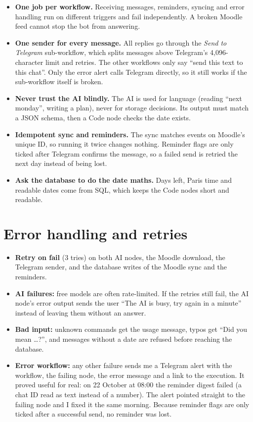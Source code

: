 \documentclass[10pt,a4paper]{article}
\begin{document}
\begin{itemize}
  \item \textbf{One job per workflow.} Receiving messages, reminders, syncing and error handling run on different
  triggers and fail independently. A broken Moodle feed cannot stop the bot from answering.
  \item \textbf{One sender for every message.} All replies go through the \emph{Send to Telegram} sub-workflow, which
  splits messages above Telegram's 4,096-character limit and retries. The other workflows only say ``send this text to
  this chat''. Only the error alert calls Telegram directly, so it still works if the sub-workflow itself is broken.
  \item \textbf{Never trust the AI blindly.} The AI is used for language (reading ``next monday'', writing a plan), never
  for storage decisions. Its output must match a JSON schema, then a Code node checks the date exists.
  \item \textbf{Idempotent sync and reminders.} The sync matches events on Moodle's unique ID, so running it twice
  changes nothing. Reminder flags are only ticked after Telegram confirms the message, so a failed send is retried the
  next day instead of being lost.
  \item \textbf{Ask the database to do the date maths.} Days left, Paris time and readable dates come from SQL, which
  keeps the Code nodes short and readable.
\end{itemize}

\section{Error handling and retries}

\begin{itemize}
  \item \textbf{Retry on fail} (3 tries) on both AI nodes, the Moodle download, the Telegram sender, and the database
  writes of the Moodle sync and the reminders.
  \item \textbf{AI failures:} free models are often rate-limited. If the retries still fail, the AI node's error output
  sends the user ``The AI is busy, try again in a minute'' instead of leaving them without an answer.
  \item \textbf{Bad input:} unknown commands get the usage message, typos get ``Did you mean \ldots?'', and messages
  without a date are refused before reaching the database.
  \item \textbf{Error workflow:} any other failure sends me a Telegram alert with the workflow, the failing node, the
  error message and a link to the execution. It proved useful for real: on 22 October at 08:00 the reminder digest failed (a chat ID read as text instead of a number). The alert pointed straight to the failing node and I fixed it the same morning. Because reminder flags are only ticked after a successful send, no reminder was lost.
\end{itemize}
\end{document}
